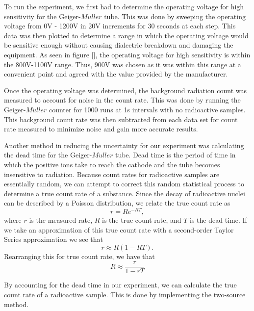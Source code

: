 
\par To run the experiment, we first had to determine the operating voltage for high sensitivity for the Geiger-$M\ddot{u}ller$ tube. This was done by sweeping the operating voltage from 0V - 1200V in 20V increments for 30 seconds at each step. This data was then plotted to determine a range in which the operating voltage would be sensitive enough without causing dialectric breakdown and damaging the equipment. As seen in figure [], the operating voltage for high sensitivity is within the 800V-1100V range. Thus, 900V was chosen as it was within this range at a convenient point and agreed with the value provided by the manufacturer.


\par Once the operating voltage was determined, the background radiation count was measured to account for noise in the count rate. This was done by running the Geiger-$M\ddot{u}ller$ counter for 1000 runs at 1s intervals with no radioactive samples. This background count rate was then subtracted from each data set for count rate measured to minimize noise and gain more accurate results.

\par Another method in reducing the uncertainty for our experiment was calculating the dead time for the Geiger-$M\ddot{u}ller$ tube. Dead time is the period of time in which the positive ions take to reach the cathode and the tube becomes insensitive to radiation. Because count rates for radioactive samples are essentially random, we can attempt to correct this random statistical process to determine a true count rate of a substance.  Since the decay of radioactive nuclei can be described by a Poisson distribution, we relate the true count rate as
\begin{equation}
r = Re^{-RT},
\label{eq:ActualCountRate}
\end{equation}
where $r$ is the measured rate, $R$ is the true count rate, and $T$ is the dead time. If we take an approximation of this true count rate with a second-order Taylor Series approximation we see that
\begin{equation}
r \approx R(1-RT).
\label{eq:ApproxCountRate}
\end{equation}
Rearranging this for true count rate, we have that
\begin{equation}
R \approx \frac{r}{1-rT}
\label{eq:TrueCountRate}
\end{equation}

\par By accounting for the dead time in our experiment, we can calculate the true count rate of a radioactive sample. This is done by implementing the two-source method.

